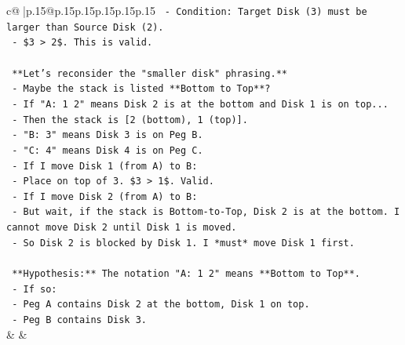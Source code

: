 \documentclass{article}
\begin{document}
{\begin{supertabular}{c@{$\;$}|p{.15\linewidth}@{}p{.15\linewidth}p{.15\linewidth}p{.15\linewidth}p{.15\linewidth}p{.15\linewidth}}
{{{\texttt{    {-} Condition: Target Disk (3) must be larger than Source Disk (2).} \\
\texttt{    {-} \$3 > 2\$. This is valid.} \\
\\ 
\texttt{    **Let's reconsider the "smaller disk" phrasing.**} \\
\texttt{    {-} Maybe the stack is listed **Bottom to Top**?} \\
\texttt{      {-} If "A: 1 2" means Disk 2 is at the bottom and Disk 1 is on top...} \\
\texttt{      {-} Then the stack is {[}2 (bottom), 1 (top){]}.} \\
\texttt{      {-} "B: 3" means Disk 3 is on Peg B.} \\
\texttt{      {-} "C: 4" means Disk 4 is on Peg C.} \\
\texttt{      {-} If I move Disk 1 (from A) to B:} \\
\texttt{        {-} Place on top of 3. \$3 > 1\$. Valid.} \\
\texttt{      {-} If I move Disk 2 (from A) to B:} \\
\texttt{        {-} But wait, if the stack is Bottom{-}to{-}Top, Disk 2 is at the bottom. I cannot move Disk 2 until Disk 1 is moved.} \\
\texttt{        {-} So Disk 2 is blocked by Disk 1. I *must* move Disk 1 first.} \\
\\ 
\texttt{    **Hypothesis:** The notation "A: 1 2" means **Bottom to Top**.} \\
\texttt{    {-} If so:} \\
\texttt{      {-} Peg A contains Disk 2 at the bottom, Disk 1 on top.} \\
\texttt{      {-} Peg B contains Disk 3.} \\
            }
        }
    }
    & & \\ \\


\end{supertabular}}
\end{document}
